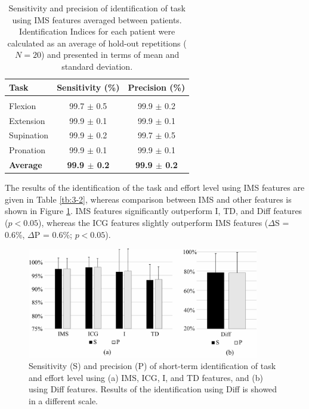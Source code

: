 \begin{table}[h!]
\centering
\caption{Sensitivity and precision of identification of task using IMS features averaged between patients. Identification Indices for each patient were calculated as an average of hold-out repetitions ($N = 20$) and presented in terms of mean and standard deviation.}
\small
\vspace{3mm}
\label{tb:3-1}
\begin{threeparttable}
\begin{tabular}{lcc}
Task       & Sensitivity (\%)           & Precision (\%) \\ \hline
              &                &                                              \\
Flexion             & 99.7 $\pm$ 0.5             & 99.9 $\pm$ 0.2                      \\
Extension             & 99.9 $\pm$ 0.1             & 99.9 $\pm$ 0.1                      \\
Supination             & 99.9 $\pm$ 0.2             & 99.7 $\pm$ 0.5                          \\
Pronation             & 99.9 $\pm$ 0.1            & 99.9 $\pm$ 0.1             \\
\textbf{Average}             & \textbf{99.9 $\pm$ 0.2}             & \textbf{99.9 $\pm$ 0.2}           
\end{tabular}
    \end{threeparttable}
\end{table}


The results of the identification of the task and effort level using IMS features are given in Table \ref{tb:3-2}, whereas comparison between IMS and other features is shown in Figure \ref{fig:3-7}. IMS features significantly outperform I, TD, and Diff features ($p < 0.05$), whereas the ICG features slightly outperform IMS features ($\Delta$S = 0.6\%, $\Delta$P = 0.6\%; $p < 0.05$).

\begin{figure}[ht]
\centering
\includegraphics[width=0.9\textwidth]{Images/figure3_7.png}
\caption{Sensitivity (S) and precision (P) of short-term identification of task and effort level using (a) IMS, ICG, I, and TD features, and (b) using Diff features. Results of the identification using Diff is showed in a different scale.}
\label{fig:3-7}
\end{figure}   

